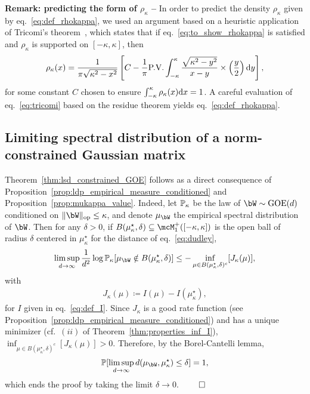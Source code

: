 \myskip
\textbf{Remark: predicting the form of $\rho_\kappa$ --} In order to predict the density $\rho_\kappa$ given by eq.~\eqref{eq:def_rhokappa}, 
we used an argument based on a heuristic application of Tricomi's theorem~\citep{tricomi1985integral}, which states that if eq.~\eqref{eq:to_show_rhokappa} is satisfied 
and $\rho_\kappa$ is supported on $[-\kappa,\kappa]$, then 
\begin{equation}\label{eq:tricomi}
    \rho_\kappa(x) = \frac{1}{\pi \sqrt{\kappa^2-x^2}}\left[C - \frac{1}{\pi} \textrm{P.V.} \int_{-\kappa}^\kappa \frac{\sqrt{\kappa^2-y^2}}{x-y} \times \left(\frac{y}{2}\right) \mathrm{d} y\right],
\end{equation}
for some constant $C$ chosen to ensure $\int_{-\kappa}^\kappa \rho_\kappa(x) \mathrm{d} x = 1$.
A careful evaluation of eq.~\eqref{eq:tricomi} based on the residue theorem yields eq.~\eqref{eq:def_rhokappa}.



\subsection{Limiting spectral distribution of a norm-constrained Gaussian matrix}\label{subsec:proof_lsd_constrained_GOE}

Theorem~\ref{thm:lsd_constrained_GOE} follows as a direct consequence of Proposition~\ref{prop:ldp_empirical_measure_conditioned} and Proposition~\ref{prop:mukappa_value}.
Indeed, let $\mathbb{P}_\kappa$ be the law of $\bW \sim \GOE(d)$ conditioned on $\|\bW\|_\op \leq \kappa$, and denote $\mu_\bW$ the empirical spectral distribution of $\bW$.
Then for any $\delta > 0$, if $B(\mu_\kappa^\star,\delta) \subseteq \mcM_1^+([-\kappa,\kappa])$ is the open ball of radius $\delta$ centered in $\mu_\kappa^\star$ for the distance of eq.~\eqref{eq:dudley}, 
\begin{align*}
    \limsup_{d \to \infty} \frac{1}{d^2} \log \bbP_\kappa[\mu_\bW \notin B(\mu_\kappa^\star, \delta)] \leq - \inf_{\mu \in B(\mu_\kappa^\star, \delta)^c} [J_\kappa(\mu)],
\end{align*}
with 
\begin{align*}
    J_\kappa(\mu) \coloneqq I(\mu) - I(\mu_\kappa^\star),
\end{align*}
for $I$ given in eq.~\eqref{eq:def_I}.
Since $J_\kappa$ is a good rate function (see Proposition~\ref{prop:ldp_empirical_measure_conditioned}) and has a unique minimizer (cf.\ $(ii)$ of Theorem~\ref{thm:properties_inf_I}), 
$\inf_{\mu \in B(\mu_\kappa^\star, \delta)^c} [J_\kappa(\mu)] > 0$. Therefore, by the Borel-Cantelli lemma,
\begin{align*}
    \bbP[\limsup_{d \to \infty} d(\mu_\bW, \mu_\kappa^\star) \leq \delta] = 1,
\end{align*}
which ends the proof by taking the limit $\delta \to 0$.
$\qed$